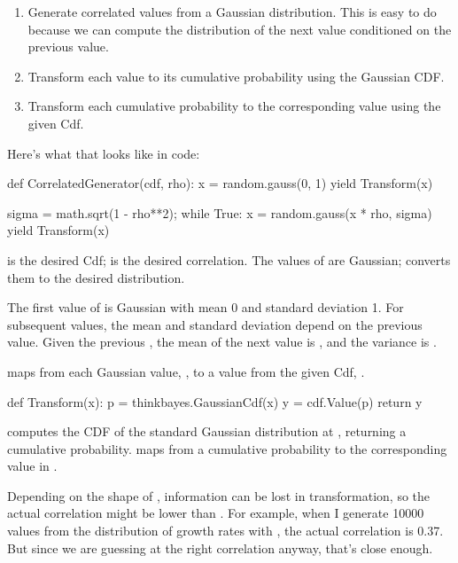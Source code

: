 \documentclass[12pt]{book}
\theoremstyle{exercise}
\begin{document}
\begin{enumerate}

\item Generate correlated values from a Gaussian distribution.
  This is easy to do because we can compute the distribution
  of the next value conditioned on the previous value.

\item Transform each value to its cumulative probability using
  the Gaussian CDF.

\item Transform each cumulative probability to the corresponding value
  using the given Cdf.

\end{enumerate}

Here's what that looks like in code:

\begin{code}
def CorrelatedGenerator(cdf, rho):
    x = random.gauss(0, 1)
    yield Transform(x)

    sigma = math.sqrt(1 - rho**2);    
    while True:
        x = random.gauss(x * rho, sigma)
        yield Transform(x)
\end{code}

 is the desired Cdf;  is the desired correlation.
The values of  are Gaussian;  converts them
to the desired distribution.

The first value of  is Gaussian with mean 0 and standard
deviation 1.  For subsequent values, the mean and standard deviation
depend on the previous value.  Given the previous , the mean of the
next value is , and the variance is .

 maps from each
Gaussian value, , to a value from the given Cdf, .

\begin{code}
    def Transform(x):
        p = thinkbayes.GaussianCdf(x)
        y = cdf.Value(p)
        return y
\end{code}

 computes the CDF of the standard Gaussian
distribution at , returning a cumulative probability.
 maps from a cumulative probability to the
corresponding value in .

Depending on the shape of , information can
be lost in transformation, so the actual correlation might be
lower than .  For example, when I generate
10000 values from the distribution of growth rates with
, the actual correlation is 0.37.
But since we are guessing at the right correlation anyway,
that's close enough.
\end{document}
